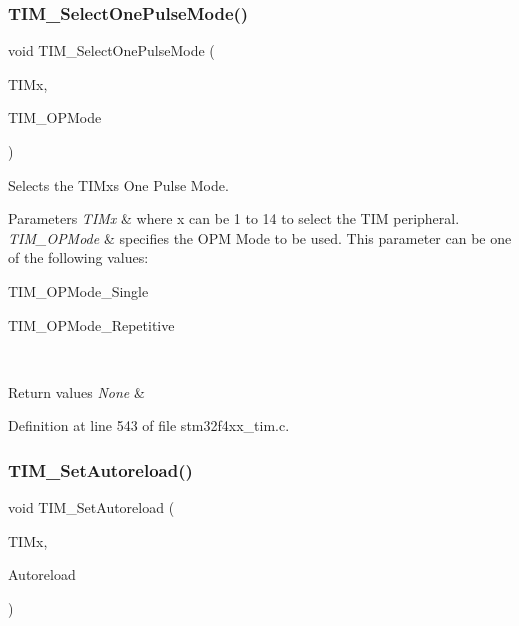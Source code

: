 \subsubsection{\texorpdfstring{T\+I\+M\+\_\+\+Select\+One\+Pulse\+Mode()}{TIM\_SelectOnePulseMode()}}
{\footnotesize\ttfamily void T\+I\+M\+\_\+\+Select\+One\+Pulse\+Mode (\begin{DoxyParamCaption}\item[{\hyperlink{struct_t_i_m___type_def}{T\+I\+M\+\_\+\+Type\+Def} $\ast$}]{T\+I\+Mx,  }\item[{uint16\+\_\+t}]{T\+I\+M\+\_\+\+O\+P\+Mode }\end{DoxyParamCaption})}



Selects the T\+I\+Mx\textquotesingle{}s One Pulse Mode. 


\begin{DoxyParams}{Parameters}
{\em T\+I\+Mx} & where x can be 1 to 14 to select the T\+IM peripheral. \\
\hline
{\em T\+I\+M\+\_\+\+O\+P\+Mode} & specifies the O\+PM Mode to be used. This parameter can be one of the following values\+: \begin{DoxyItemize}
\item T\+I\+M\+\_\+\+O\+P\+Mode\+\_\+\+Single \item T\+I\+M\+\_\+\+O\+P\+Mode\+\_\+\+Repetitive \end{DoxyItemize}
\\
\hline
\end{DoxyParams}

\begin{DoxyRetVals}{Return values}
{\em None} & \\
\hline
\end{DoxyRetVals}


Definition at line 543 of file stm32f4xx\+\_\+tim.\+c.

\mbox{\label{group___t_i_m___group1_gad6a388d498c7f299d00a9d0871943041}} 
\subsubsection{\texorpdfstring{T\+I\+M\+\_\+\+Set\+Autoreload()}{TIM\_SetAutoreload()}}
{\footnotesize\ttfamily void T\+I\+M\+\_\+\+Set\+Autoreload (\begin{DoxyParamCaption}\item[{\hyperlink{struct_t_i_m___type_def}{T\+I\+M\+\_\+\+Type\+Def} $\ast$}]{T\+I\+Mx,  }\item[{uint32\+\_\+t}]{Autoreload }\end{DoxyParamCaption})}



